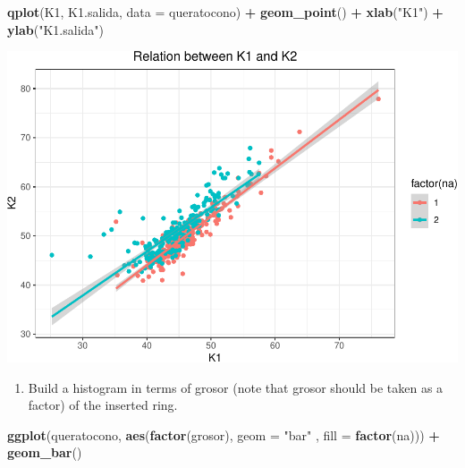 \documentclass[
]{article}
\newenvironment{Shaded}{\begin{snugshade}}{\end{snugshade}}
\newcommand{\DataTypeTok}[1]{\textcolor[rgb]{0.13,0.29,0.53}{#1}}
\newcommand{\KeywordTok}[1]{\textcolor[rgb]{0.13,0.29,0.53}{\textbf{#1}}}
\newcommand{\NormalTok}[1]{#1}
\newcommand{\OperatorTok}[1]{\textcolor[rgb]{0.81,0.36,0.00}{\textbf{#1}}}
\newcommand{\StringTok}[1]{\textcolor[rgb]{0.31,0.60,0.02}{#1}}
\providecommand{\tightlist}{%
  \setlength{\itemsep}{0pt}\setlength{\parskip}{0pt}}
\begin{document}
\begin{Shaded}
\begin{Highlighting}[]
\KeywordTok{qplot}\NormalTok{(K1, K1.salida, }\DataTypeTok{data =}\NormalTok{ queratocono) }\OperatorTok{+}
\StringTok{  }\KeywordTok{geom_point}\NormalTok{() }\OperatorTok{+}\StringTok{ }
\StringTok{  }\KeywordTok{xlab}\NormalTok{(}\StringTok{"K1"}\NormalTok{) }\OperatorTok{+}\StringTok{ }\KeywordTok{ylab}\NormalTok{(}\StringTok{"K1.salida"}\NormalTok{)}
\end{Highlighting}
\end{Shaded}

\includegraphics{document_files/figure-latex/unnamed-chunk-4-1.pdf}

\begin{enumerate}
\def\labelenumi{\arabic{enumi}.}
\setcounter{enumi}{3}
\tightlist
\item
  Build a histogram in terms of grosor (note that grosor should be taken
  as a factor) of the inserted ring.
\end{enumerate}

\begin{Shaded}
\begin{Highlighting}[]
\KeywordTok{ggplot}\NormalTok{(queratocono, }\KeywordTok{aes}\NormalTok{(}\KeywordTok{factor}\NormalTok{(grosor), }\DataTypeTok{geom =} \StringTok{"bar"}\NormalTok{ , }\DataTypeTok{fill =} \KeywordTok{factor}\NormalTok{(na))) }\OperatorTok{+}
\StringTok{  }\KeywordTok{geom_bar}\NormalTok{()}
\end{Highlighting}
\end{Shaded}
\end{document}
